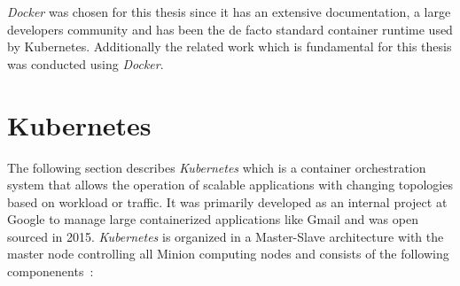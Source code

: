 \textit{Docker} was chosen for this thesis since it has an extensive documentation, a large developers community and has been the de facto standard container runtime used by Kubernetes.
Additionally the related work which is fundamental for this thesis was conducted using \textit{Docker}.

\section{Kubernetes}
The following section describes \textit{Kubernetes} which is a container orchestration system that allows the operation of scalable applications with changing topologies based on workload or traffic.
It was primarily developed as an internal project at Google to manage large containerized applications like Gmail and was open sourced in 2015.
\textit{Kubernetes} is organized in a Master-Slave architecture with the master node controlling all Minion computing nodes and consists of the following componenents~\cite{KUB, KUB4}:
